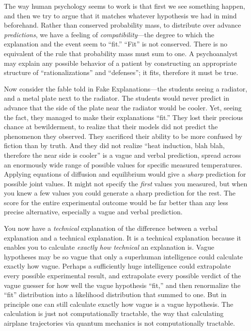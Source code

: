 {
 The way human psychology seems to work is that first we see
something happen, and then we try to argue that it matches whatever
hypothesis we had in mind beforehand. Rather than conserved probability
mass, to distribute over advance \textit{predictions}, we have a
feeling of \textit{compatibility}{}---the degree to which the
explanation and the event seem to
``fit.''
``Fit'' is not conserved. There is
no equivalent of the rule that probability mass must sum to one. A
psychoanalyst may explain any possible behavior of a patient by
constructing an appropriate structure of
``rationalizations'' and
``defenses''; it fits, therefore it
must be true.}

{
 Now consider the fable told in Fake Explanations---the students
seeing a radiator, and a metal plate next to the radiator. The students
would never predict in advance that the side of the plate near the
radiator would be cooler. Yet, seeing the fact, they managed to make
their explanations ``fit.'' They
lost their precious chance at bewilderment, to realize that their
models did not predict the phenomenon they observed. They sacrificed
their ability to be more confused by fiction than by truth. And they
did not realize ``heat induction, blah blah, therefore
the near side is cooler'' is a vague and verbal
prediction, spread across an enormously wide range of possible values
for specific measured temperatures. Applying equations of diffusion and
equilibrium would give a \textit{sharp} prediction for possible joint
values. It might not specify the \textit{first} values you measured,
but when you knew a few values you could generate a sharp prediction
for the rest. The score for the entire experimental outcome would be
far better than any less precise alternative, especially a vague and
verbal prediction.}

{
 You now have a \textit{technical} explanation of the difference
between a verbal explanation and a technical explanation. It is a
technical explanation because it enables you to calculate
\textit{exactly how technical} an explanation is. Vague hypotheses may
be so vague that only a superhuman intelligence could calculate exactly
how vague. Perhaps a sufficiently huge intelligence could extrapolate
every possible experimental result, and extrapolate every possible
verdict of the vague guesser for how well the vague hypothesis
``fit,'' and then renormalize the
``fit'' distribution into a
likelihood distribution that summed to one. But in principle one can
still calculate exactly how vague is a vague hypothesis. The
calculation is just not computationally tractable, the way that
calculating airplane trajectories via quantum mechanics is not
computationally tractable.}


